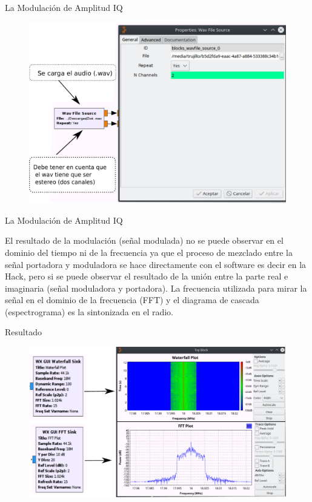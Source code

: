 \begin{frame}{La Modulación de Amplitud IQ}

\begin{figure}[H]
\centering
\vspace{-3mm}
\includegraphics[width=.7\textwidth]{parte3/lab15/pdf/lab15_4.pdf}
\end{figure}

\end{frame}

\begin{frame}{La Modulación de Amplitud IQ}


El resultado de la modulación (señal modulada) no se puede observar en el dominio del tiempo ni de la frecuencia ya que el proceso de mezclado entre la señal portadora y moduladora se hace directamente con el software es decir en la Hack, pero si se puede observar el resultado de la unión entre la parte real e imaginaria (señal moduladora y portadora).  La frecuencia utilizada para mirar la señal en el dominio de la frecuencia (FFT) y el diagrama de cascada (espectrograma) es la sintonizada en el radio.

\end{frame}

\begin{frame}{Resultado}

\begin{figure}[H]
\centering
\vspace{-3mm}
\includegraphics[width=\textwidth]{parte3/lab15/pdf/lab15_5.pdf}
\end{figure}

\end{frame}

